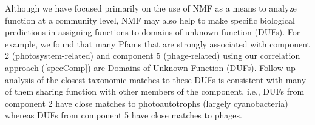 
Although we have focused primarily on the use of NMF as a means to analyze function at a community level, NMF may also help to make specific biological predictions in assigning functions to domains of unknown function (DUFs). For example, we found that many Pfams that are strongly associated with component 2 (photosystem-related) and component 5 (phage-related) using our correlation approach (\ref{specComp}) are Domains of Unknown Function (DUFs). Follow-up analysis of the closest taxonomic matches to these DUFs is consistent with many of them sharing function with other members of the component, i.e., DUFs from component 2 have close matches to photoautotrophs (largely cyanobacteria) whereas DUFs from component 5 have close matches to phages. 

